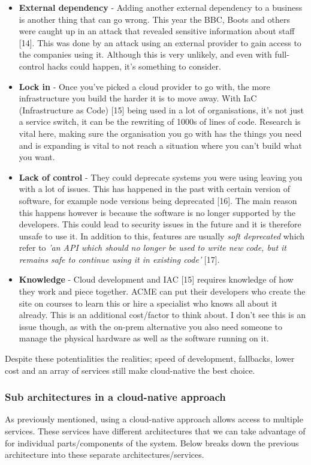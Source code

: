   \begin{itemize}
    \item \textbf{External dependency} - Adding another external dependency to a business is another thing that can go wrong. This year the BBC, Boots and
    others were caught up in an attack that revealed sensitive information about staff [14]. This was done by an attack using an external provider to gain 
    access to the companies using it. Although this is very unlikely, and even with full-control hacks could happen, it's something to consider.
    \item \textbf{Lock in} - Once you've picked a cloud provider to go with, the more infrastructure you build the harder it is to move away. With 
    IaC (Infrastructure as Code) [15] being used in a lot of organisations, it's not just a service switch, it can be the rewriting of 1000s of lines
    of code. Research is vital here, making sure the organisation you go with has the things you need and is expanding is vital to not reach a situation where
    you can't build what you want. 
    \item \textbf{Lack of control} - They could deprecate systems you were using leaving  you with a lot of issues. This has happened in the past with 
    certain version of software, for example node versions being deprecated [16]. The main reason this happens however is because the software is no 
    longer supported by the developers. This could lead to security issues in the future and it is therefore unsafe to use it. In addition to this, features 
    are usually \textit{soft deprecated} which refer to \textit{'an API which should no longer be used to write new code, but it remains safe to continue using 
    it in existing code'} [17].
    \item \textbf{Knowledge} - Cloud development and IAC [15] requires knowledge of how they work and piece together. ACME can put their developers who create
    the site on courses to learn this or hire a specialist who knows all about it already. This is an additional cost/factor to think about. I 
    don't see this is an issue though, as with the on-prem alternative you also need someone to manage the physical hardware as well as the software 
    running on it.
  \end{itemize}

  Despite these potentialities the realities; speed of development, fallbacks, lower cost and an array of services still make cloud-native the best choice.

  \newpage
  \subsubsection{Sub architectures in a cloud-native approach}
  As previously mentioned, using a cloud-native approach allows access to multiple services. These services have different architectures that we can take
  advantage of for individual parts/components of the system. Below breaks down the previous architecture into these separate architectures/services.

